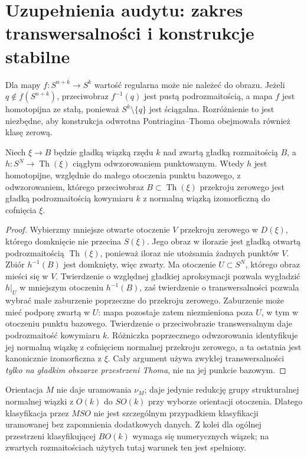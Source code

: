 \section{Uzupełnienia audytu: zakres transwersalności i konstrukcje stabilne}
\begin{uwaga}
Dla mapy $f:S^{n+k}\to S^k$ wartość regularna może nie należeć
do obrazu. Jeżeli $q\notin f(S^{n+k})$, przeciwobraz $f^{-1}(q)$
jest pustą podrozmaitością, a mapa $f$ jest homotopijna ze stałą,
ponieważ $S^k\setminus\{q\}$ jest ściągalna. Rozróżnienie
to jest niezbędne, aby konstrukcja odwrotna Pontriagina--Thoma
obejmowała również klasę zerową.
\end{uwaga}

\begin{lemat}
\label{lem:thom-transversal-v9-audyt}
Niech $\xi\to B$ będzie gładką wiązką rzędu $k$ nad zwartą
gładką rozmaitością $B$, a $h:S^N\to\operatorname{Th}(\xi)$
ciągłym odwzorowaniem punktowanym. Wtedy $h$ jest
homotopijne, względnie do małego otoczenia punktu bazowego,
z odwzorowaniem, którego przeciwobraz $B\subset\operatorname{Th}(\xi)$
przekroju zerowego jest gładką podrozmaitością
kowymiaru $k$ z normalną wiązką izomorficzną do
cofnięcia $\xi$.
\end{lemat}
\begin{proof}
Wybierzmy mniejsze otwarte otoczenie $V$ przekroju zerowego
w $D(\xi)$, którego domknięcie nie przecina $S(\xi)$.
Jego obraz w ilorazie jest gładką otwartą podrozmaitością
$\operatorname{Th}(\xi)$, ponieważ iloraz nie utożsamia
żadnych punktów $V$. Zbiór $h^{-1}(B)$ jest domknięty,
więc zwarty. Ma otoczenie $U\subset S^N$, którego
obraz mieści się w $V$. Twierdzenie o względnej gładkiej
aproksymacji pozwala wygładzić $h|_U$ w mniejszym
otoczeniu $h^{-1}(B)$, zaś twierdzenie o transwersalności
pozwala wybrać małe zaburzenie poprzeczne do przekroju
zerowego. Zaburzenie może mieć podporę zwartą w $U$:
mapa pozostaje zatem niezmieniona poza $U$, w tym
w otoczeniu punktu bazowego. Twierdzenie o przeciwobrazie
transwersalnym daje podrozmaitość kowymiaru $k$.
Różniczka poprzecznego odwzorowania identyfikuje jej
normalną wiązkę z cofnięciem normalnej przekroju
zerowego, a ta ostatnia jest kanonicznie izomorficzna
z $\xi$. Cały argument używa zwykłej transwersalności
\emph{tylko na gładkim obszarze przestrzeni Thoma},
nie na jej punkcie bazowym.
\end{proof}

\begin{uwaga}
Orientacja $M$ nie daje uramowania $\nu_M$;
daje jedynie redukcję grupy strukturalnej normalnej
wiązki z $O(k)$ do $SO(k)$ przy wyborze orientacji otoczenia.
Dlatego klasyfikacja przez $MSO$ nie jest szczególnym
przypadkiem klasyfikacji uramowanej bez zapomnienia
dodatkowych danych. Z kolei dla ogólnej przestrzeni
klasyfikującej $BO(k)$ wymaga się numerycznych wiązek;
na zwartych rozmaitościach użytych tutaj warunek ten
jest spełniony.
\end{uwaga}

